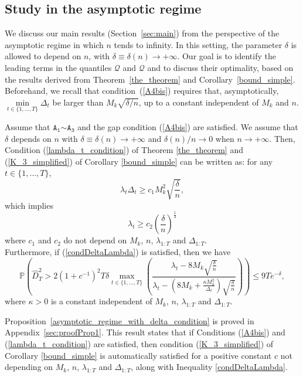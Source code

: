 \documentclass[twoside,11pt]{article}
\newcommand{\nb}{n}
\newcommand{\PPO}{\mathbb{P} }
\newcommand{\A}[1]{$\mathtt{A_#1}$}
\newcommand{\qmaj}{\mathcal{Q}}
\newcommand{\qmajbis}{\mathscr{Q}}
\begin{document}
\subsection{Study in the asymptotic regime}\label{sec:Discussion:asym} 
We discuss our main results (Section~\ref{sec:main}) from the perspective of the asymptotic regime in which $n$ tends to infinity. In this setting, the parameter $\delta$ is allowed to depend on $n$, with $\delta \equiv \delta(n) \to +\infty$. Our goal is to identify the leading terms in the quantiles $\qmaj$ and $\qmajbis$ and to discuss their optimality, based on the results derived from Theorem~\ref{the_theorem} and Corollary~\ref{bound_simple}. Beforehand, we recall that condition~(\ref{A4bis}) requires that, asymptotically, $\underset{t \in \{1,\ldots,T\}}{\min}\Delta_t$ be larger than $M_k \sqrt{\delta / n}$, up to a constant independent of $M_k$ and $n$.
\begin{proposition}\label{prop: asymp1}
Assume that \A{1}$\sim$\A{3} and the gap condition (\ref{A4bis}) are satisfied. We assume that $\delta$ depends on $n$ with $\delta\equiv \delta(n)\to+\infty$ and $\delta(n)/n\to 0$ when $n\to+\infty$. Then, Condition (\ref{lambda_t_condition}) of Theorem \ref{the_theorem} and (\ref{K_3_simplified}) of Corollary \ref{bound_simple} can be written as:  for any $t \in \{1,\ldots,T\}$, 
\begin{equation}
\label{condDeltaLambda}
\lambda_t \Delta_t \geq c_1 M_k^2 \sqrt{\frac{\delta}{\nb}},
\end{equation}
which implies 
$$   \lambda_t \geq c_2  \left( \frac{\delta}{\nb} \right)^{\frac{1}{4}} 
$$
where $c_1$ and $c_2$ do not depend on $M_k$, $\nb$, $\lambda_{1:T}$ and $\Delta_{1:T}$. \\
Furthermore, if (\ref{condDeltaLambda}) is satisfied, then we have
\begin{equation}
    \PPO \left(\widehat{D}^2_T > 2\left(1+c^{-1}\right)^2 T \delta \underset{t\in\{1,\ldots,T\}}{\max}  \left(\frac{\lambda_t - 8 M_k \sqrt{\frac{\delta}{\nb}}}{\lambda_t - \left(8 M_k  + \frac{\kappa M_k^2}{\Delta_t} \right) \sqrt{\frac{\delta}{\nb}}}  \right) \right) \leq  9 T e^{-\delta},
    \label{simplied_version_asymptotic_bound}
\end{equation}
where $\kappa >0$ is a constant independent of $M_k$, $\nb$, $\lambda_{1:T}$ and $\Delta_{1:T}$. 
\label{asymptotic_regime_with_delta_condition}
\end{proposition}
Proposition~\ref{asymptotic_regime_with_delta_condition} is proved in Appendix~\ref{sec:proofProp1}. This result states that if Conditions (\ref{A4bis}) and (\ref{lambda_t_condition}) are satisfied, then condition (\ref{K_3_simplified}) of Corollary \ref{bound_simple} is automatically satisfied for  a positive constant $c$ not depending on $M_k$, $\nb$, $\lambda_{1:T}$ and $\Delta_{1:T}$, along with Inequality \eqref{condDeltaLambda}. 
\end{document}
